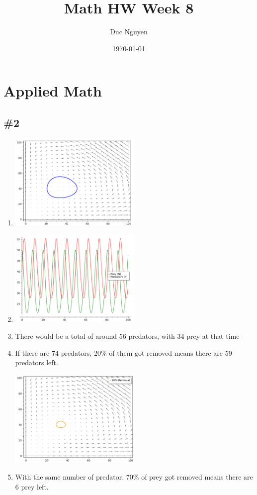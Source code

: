 \documentclass[12pt]{article}
\title{Math HW Week 8}
\author{Duc Nguyen}
\date{\today}
\begin{document}
\maketitle
\section*{Applied Math}
\subsection*{\#2}
\begin{enumerate}[label=\alph*.]
    \item \includegraphics[width=0.5\textwidth]{hw8.png}
    \item \includegraphics[width=0.5\textwidth]{hw8_2.png}

\item There would be a total of around 56 predators, with 34 prey at that time
\item If there are 74 predators, 20\% of them got removed means there are 59 predators left.

\includegraphics[width=0.5\textwidth]{hw8_3.png}
\item With the same number of predator, 70\% of prey got removed means there are 6 prey left. 


\end{enumerate}
\end{document}
